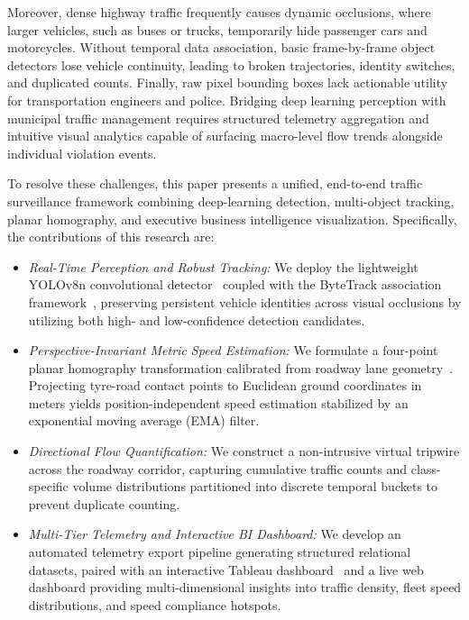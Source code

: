 \documentclass[conference]{IEEEtran}
\begin{document}
Moreover, dense highway traffic frequently causes dynamic occlusions, where larger vehicles, such as buses or trucks, temporarily hide passenger cars and motorcycles. Without temporal data association, basic frame-by-frame object detectors lose vehicle continuity, leading to broken trajectories, identity switches, and duplicated counts. Finally, raw pixel bounding boxes lack actionable utility for transportation engineers and police. Bridging deep learning perception with municipal traffic management requires structured telemetry aggregation and intuitive visual analytics capable of surfacing macro-level flow trends alongside individual violation events.

To resolve these challenges, this paper presents a unified, end-to-end traffic surveillance framework combining deep-learning detection, multi-object tracking, planar homography, and executive business intelligence visualization. Specifically, the contributions of this research are:
\begin{itemize}
    \item[\textit{i)}] \textit{Real-Time Perception and Robust Tracking:} We deploy the lightweight YOLOv8n convolutional detector~\cite{ultralytics2023yolov8} coupled with the ByteTrack association framework~\cite{zhang2022bytetrack}, preserving persistent vehicle identities across visual occlusions by utilizing both high- and low-confidence detection candidates.
    \item[\textit{ii)}] \textit{Perspective-Invariant Metric Speed Estimation:} We formulate a four-point planar homography transformation calibrated from roadway lane geometry~\cite{hartley2003multiple, he2019vehicle}. Projecting tyre-road contact points to Euclidean ground coordinates in meters yields position-independent speed estimation stabilized by an exponential moving average (EMA) filter.
    \item[\textit{iii)}] \textit{Directional Flow Quantification:} We construct a non-intrusive virtual tripwire across the roadway corridor, capturing cumulative traffic counts and class-specific volume distributions partitioned into discrete temporal buckets to prevent duplicate counting.
    \item[\textit{iv)}] \textit{Multi-Tier Telemetry and Interactive BI Dashboard:} We develop an automated telemetry export pipeline generating structured relational datasets, paired with an interactive Tableau dashboard~\cite{stolte2002polaris, heer2008prefuse} and a live web dashboard providing multi-dimensional insights into traffic density, fleet speed distributions, and speed compliance hotspots.
\end{itemize}
\end{document}
